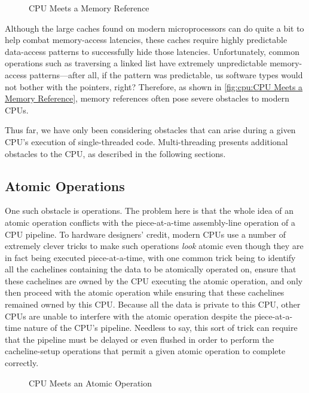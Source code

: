 \begin{figure}
\centering
{}
\caption{CPU Meets a Memory Reference}
\end{figure}

Although the large caches found on modern microprocessors can do quite
a bit to help combat memory-access latencies,
these caches require highly predictable data-access patterns to
successfully hide those latencies.
Unfortunately, common operations such as traversing a linked list
have extremely unpredictable memory-access patterns---after all,
if the pattern was predictable, us software types would not bother
with the pointers, right?
Therefore, as shown in
\cref{fig:cpu:CPU Meets a Memory Reference},
memory references often pose severe obstacles to modern CPUs.

Thus far, we have only been considering obstacles that can arise during
a given CPU's execution of single-threaded code.
Multi-threading presents additional obstacles to the CPU, as
described in the following sections.

\subsection{Atomic Operations}
\label{sec:cpu:Atomic Operations}

One such obstacle is  operations.
The problem here is that the whole idea of an atomic operation conflicts with
the piece-at-a-time assembly-line operation of a CPU pipeline.
To hardware designers' credit, modern CPUs use a number of extremely clever
tricks to make such operations \emph{look} atomic even though they
are in fact being executed piece-at-a-time,
with one common trick being to identify all the cachelines containing the
data to be atomically operated on,
ensure that these cachelines are owned by the CPU executing the
atomic operation, and only then proceed with the atomic operation
while ensuring that these cachelines remained owned by this CPU\@.
Because all the data is private to this CPU, other CPUs are unable to
interfere with the atomic operation despite the piece-at-a-time nature
of the CPU's pipeline.
Needless to say, this sort of trick can require that
the pipeline must be delayed or even flushed in order to
perform the cacheline-setup operations that
permit a given atomic operation to complete correctly.

\begin{figure}
\centering
{}
\caption{CPU Meets an Atomic Operation}
\end{figure}

